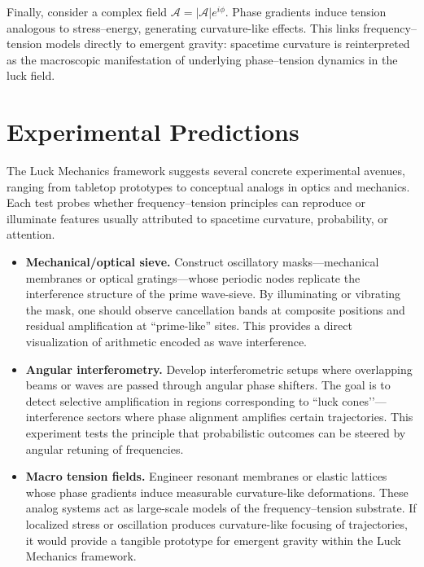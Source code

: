 \documentclass[12pt]{article}
\newcommand{\Afield}{\mathcal{A}}
\newcommand{\phiang}{\phi}
\theoremstyle{plain}
\theoremstyle{definition}
\begin{document}
Finally, consider a complex field $\Afield = |\Afield|e^{i\phiang}$. Phase 
gradients induce tension analogous to stress–energy, generating curvature-like 
effects. This links frequency–tension models directly to emergent gravity: 
spacetime curvature is reinterpreted as the macroscopic manifestation of 
underlying phase–tension dynamics in the luck field.

\section{Experimental Predictions}

The Luck Mechanics framework suggests several concrete experimental avenues, 
ranging from tabletop prototypes to conceptual analogs in optics and mechanics. 
Each test probes whether frequency–tension principles can reproduce or illuminate 
features usually attributed to spacetime curvature, probability, or attention.

\begin{itemize}[leftmargin=1.1em]
  \item \textbf{Mechanical/optical sieve.}  
  Construct oscillatory masks—mechanical membranes or optical gratings—whose 
  periodic nodes replicate the interference structure of the prime wave-sieve. 
  By illuminating or vibrating the mask, one should observe cancellation bands 
  at composite positions and residual amplification at “prime-like” sites. This 
  provides a direct visualization of arithmetic encoded as wave interference.

  \item \textbf{Angular interferometry.}  
  Develop interferometric setups where overlapping beams or waves are passed 
  through angular phase shifters. The goal is to detect selective amplification 
  in regions corresponding to ``luck cones’’—interference sectors where phase 
  alignment amplifies certain trajectories. This experiment tests the principle 
  that probabilistic outcomes can be steered by angular retuning of frequencies.

  \item \textbf{Macro tension fields.}  
  Engineer resonant membranes or elastic lattices whose phase gradients induce 
  measurable curvature-like deformations. These analog systems act as 
  large-scale models of the frequency–tension substrate. If localized stress or 
  oscillation produces curvature-like focusing of trajectories, it would provide 
  a tangible prototype for emergent gravity within the Luck Mechanics framework.
\end{itemize}
\end{document}
